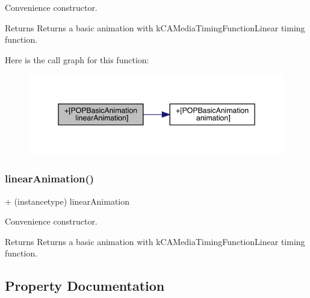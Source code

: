 Convenience constructor. \begin{DoxyReturn}{Returns}
Returns a basic animation with k\+C\+A\+Media\+Timing\+Function\+Linear timing function. 
\end{DoxyReturn}
Here is the call graph for this function\+:\nopagebreak
\begin{figure}[H]
\begin{center}
\leavevmode
\includegraphics[width=345pt]{interface_p_o_p_basic_animation_a67906e9230c1e8a01d052d86445c9d1e_cgraph}
\end{center}
\end{figure}
\mbox{\label{interface_p_o_p_basic_animation_a67906e9230c1e8a01d052d86445c9d1e}} 
\subsubsection{\texorpdfstring{linear\+Animation()}{linearAnimation()}\hspace{0.1cm}{\footnotesize\ttfamily [3/3]}}
{\footnotesize\ttfamily + (instancetype) linear\+Animation \begin{DoxyParamCaption}{ }\end{DoxyParamCaption}}

Convenience constructor. \begin{DoxyReturn}{Returns}
Returns a basic animation with k\+C\+A\+Media\+Timing\+Function\+Linear timing function. 
\end{DoxyReturn}


\subsection{Property Documentation}
\mbox{\label{interface_p_o_p_basic_animation_a50edea713d4d915a925b19095dba0f7d}} 
